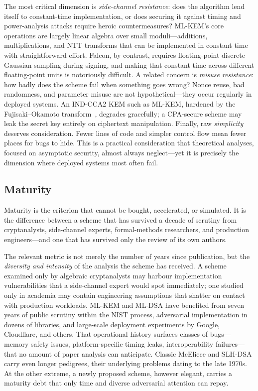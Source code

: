 The most critical dimension is \emph{side-channel resistance}: does the algorithm lend itself to constant-time implementation, or does securing it against timing and power-analysis attacks require heroic countermeasures?  ML-KEM's core operations are largely linear algebra over small moduli---additions, multiplications, and NTT transforms that can be implemented in constant time with straightforward effort.  Falcon, by contrast, requires floating-point discrete Gaussian sampling during signing, and making that constant-time across different floating-point units is notoriously difficult.  A related concern is \emph{misuse resistance}: how badly does the scheme fail when something goes wrong?  Nonce reuse, bad randomness, and parameter misuse are not hypothetical---they occur regularly in deployed systems.  An IND-CCA2 KEM such as ML-KEM, hardened by the Fujisaki--Okamoto transform~\cite{FujisakiOkamoto1999}, degrades gracefully; a CPA-secure scheme may leak the secret key entirely on ciphertext manipulation.  Finally, raw \emph{simplicity} deserves consideration.  Fewer lines of code and simpler control flow mean fewer places for bugs to hide.  This is a practical consideration that theoretical analyses, focused on asymptotic security, almost always neglect---yet it is precisely the dimension where deployed systems most often fail.

\subsection{Maturity}
\label{subsec:eval-maturity}

Maturity is the criterion that cannot be bought, accelerated, or simulated.  It is the difference between a scheme that has survived a decade of scrutiny from cryptanalysts, side-channel experts, formal-methods researchers, and production engineers---and one that has survived only the review of its own authors.

The relevant metric is not merely the number of years since publication, but the \emph{diversity and intensity} of the analysis the scheme has received.  A scheme examined only by algebraic cryptanalysts may harbour implementation vulnerabilities that a side-channel expert would spot immediately; one studied only in academia may contain engineering assumptions that shatter on contact with production workloads.  ML-KEM and ML-DSA have benefited from seven years of public scrutiny within the NIST process, adversarial implementation in dozens of libraries, and large-scale deployment experiments by Google, Cloudflare, and others.  That operational history surfaces classes of bugs---memory safety issues, platform-specific timing leaks, interoperability failures---that no amount of paper analysis can anticipate.  Classic McEliece and SLH-DSA carry even longer pedigrees, their underlying problems dating to the late 1970s.  At the other extreme, a newly proposed scheme, however elegant, carries a maturity debt that only time and diverse adversarial attention can repay.

